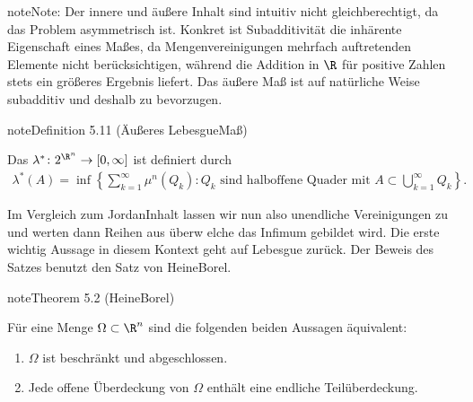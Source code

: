 \documentclass[letterpaper,10pt,english]{jupyterBook}
\begin{document}
\begin{sphinxadmonition}{note}{Note:}
\sphinxAtStartPar
Der innere und äußere Inhalt sind intuitiv nicht gleichberechtigt, da das Problem asymmetrisch ist. Konkret ist Subadditivität die inhärente Eigenschaft eines Maßes, da Mengenvereinigungen mehrfach auftretenden Elemente nicht berücksichtigen, während die Addition in \(\R\) für positive Zahlen stets ein größeres Ergebnis liefert. Das äußere Maß ist auf natürliche Weise subadditiv und deshalb zu bevorzugen.
\end{sphinxadmonition}
\label{masstheorie/masstheorie:definition-21}
\begin{sphinxadmonition}{note}{Definition 5.11 (Äußeres Lebesgue\sphinxhyphen{}Maß)}



\sphinxAtStartPar
Das  \(\lambda^* \colon 2^{\R^n} \rightarrow [0,\infty]\) ist definiert durch
\begin{equation*}
\begin{split}\lambda^*(A) = \inf \left\{ \sum_{k=1}^\infty \mu^n(Q_k) : Q_k \text{ sind halboffene Quader mit } A \subset \bigcup_{k=1}^\infty Q_k \right\}.\end{split}
\end{equation*}\end{sphinxadmonition}

\sphinxAtStartPar
Im Vergleich zum Jordan\sphinxhyphen{}Inhalt lassen wir nun also unendliche Vereinigungen zu und werten dann Reihen aus überw elche das Infimum gebildet wird. Die erste wichtig Aussage in diesem Kontext geht auf Lebesgue zurück. Der Beweis des Satzes benutzt den Satz von Heine\sphinxhyphen{}Borel.
\label{masstheorie/masstheorie:thm:heineborel}
\begin{sphinxadmonition}{note}{Theorem 5.2 (Heine\sphinxhyphen{}Borel)}



\sphinxAtStartPar
Für eine Menge \(\Omega\subset\R^n\) sind die folgenden beiden Aussagen äquivalent:
\begin{enumerate}
%
\item {} 
\sphinxAtStartPar
\(\Omega\) ist beschränkt und abgeschlossen.

\item {} 
\sphinxAtStartPar
Jede offene Überdeckung von \(\Omega\) enthält eine endliche Teilüberdeckung.

\end{enumerate}
\end{sphinxadmonition}
\end{document}
